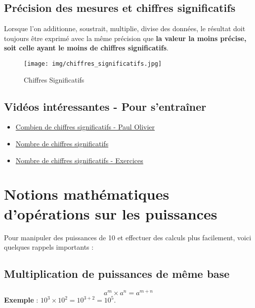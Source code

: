 \documentclass[a4paper,12pt]{article}
\begin{document}
\subsection{Précision des mesures et chiffres significatifs}

\begin{tcolorbox}[colback=red!10!white, colframe=red!75!black, title=PAR COEUR]
  Lorsque l’on additionne, soustrait, multiplie, divise des données, le résultat doit toujours être exprimé avec la même précision que \textbf{la valeur la moins précise, soit celle ayant le moins de chiffres significatifs}.
\end{tcolorbox}

\begin{figure}[H]
  \centering
  \texttt{[image: img/chiffres\_significatifs.jpg]}
  \caption{\label{} Chiffres Significatifs}
\end{figure}


\subsection{Vidéos intéressantes - Pour s'entraîner}

\begin{itemize}[noitemsep]
  \item \href{https://www.youtube.com/watch?v=1zAPfrZaAiA&ab_channel=PaulOlivier}{Combien de chiffres significatifs - Paul Olivier}
  \item \href{https://www.youtube.com/watch?v=aJKvYiGXqoM&ab_channel=FlorenceRAFFINlaphysiquechimieaulyc%C3%A9e}{Nombre de chiffres significatifs}
  \item \href{https://youtube.com/shorts/7wfK1r2kft4?si=ufaaWyjVTLT19Iv4}{Nombre de chiffres significatifs - Exercices}
\end{itemize}


\section{Notions mathématiques d'opérations sur les puissances}

Pour manipuler des puissances de 10 et effectuer des calculs plus facilement, voici quelques rappels importants :

\subsection{Multiplication de puissances de même base}
\[
a^m \times a^n = a^{m + n}
\]
\textbf{Exemple} : $ 10^3 \times 10^2 = 10^{3+2} = 10^5 $.
\end{document}
